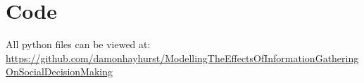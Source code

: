 \documentclass[man, floatsintext]{apa7}
\begin{document}





\printbibliography


\appendix

\section{Code}

All python files can be viewed at: \url{https://github.com/damonhayhurst/ModellingTheEffectsOfInformationGatheringOnSocialDecisionMaking} 

\end{document}
